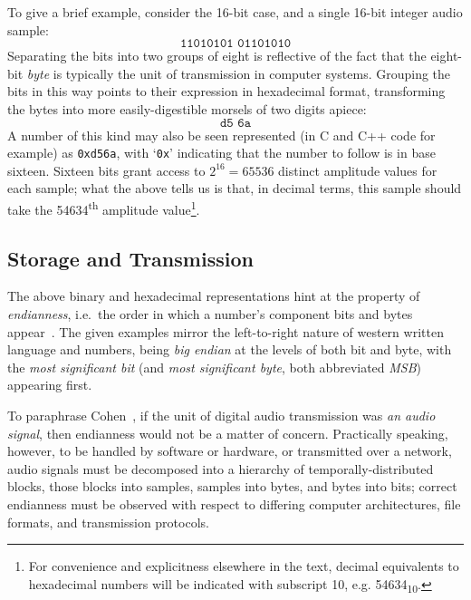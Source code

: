 To give a brief example, consider the 16-bit case, and a single 16-bit integer
audio sample:
\begin{equation*}
    \texttt{11010101 01101010}
\end{equation*}
Separating the bits into two groups of eight is reflective of the fact that the
eight-bit \textit{byte} is typically the unit of transmission in computer
systems.
Grouping the bits in this way points to their expression in hexadecimal format,
transforming the bytes into more easily-digestible morsels of two digits apiece:
\begin{equation*}
    \texttt{d5 6a}
\end{equation*}
A number of this kind may also be seen represented (in C and C++ code for
example) as \texttt{0xd56a}, with `\texttt{0x}' indicating that the number to
follow is in base sixteen.
Sixteen bits grant access to $2^{16}=\num{65536}$ distinct amplitude values for
each sample; what the above tells us is that, in decimal terms, this sample
should take the \num{54634}\textsuperscript{th} amplitude value\footnote{
    For convenience and explicitness elsewhere in the text, decimal equivalents
    to hexadecimal numbers will be indicated with subscript 10, e.g.
    \num{54634}\textsubscript{10}.
}.

\subsection{Storage and Transmission}\label{subsec:storage-and-transmission}

The above binary and hexadecimal representations hint at the property of
\textit{endianness}, i.e.\ the order in which a number's component bits and
bytes appear~\citep{cohen_holy_1981}.
The given examples mirror the left-to-right nature of western written language
and numbers, being \textit{big endian} at the levels of both bit and byte, with
the \textit{most significant bit} (and \textit{most significant byte}, both
abbreviated \textit{MSB}) appearing first.

To paraphrase Cohen~\citep{cohen_holy_1981}, if the unit of digital audio
transmission was \textit{an audio signal}, then endianness would not be a
matter of concern.
Practically speaking, however, to be handled by software or hardware, or
transmitted over a network, audio signals must be decomposed into a hierarchy
of temporally-distributed blocks, those blocks into samples, samples into bytes,
and bytes into bits;
correct endianness must be observed with respect to differing computer
architectures, file formats, and transmission protocols.

